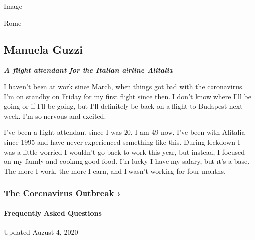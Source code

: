 Image

Rome

\hypertarget{manuela-guzzi}{%
\subsection{Manuela Guzzi}\label{manuela-guzzi}}

\emph{\textbf{A flight attendant for the Italian airline Alitalia}}

I haven't been at work since March, when things got bad with the
coronavirus. I'm on standby on Friday for my first flight since then. I
don't know where I'll be going or if I'll be going, but I'll definitely
be back on a flight to Budapest next week. I'm so nervous and excited.

I've been a flight attendant since I was 20. I am 49 now. I've been with
Alitalia since 1995 and have never experienced something like this.
During lockdown I was a little worried I wouldn't go back to work this
year, but instead, I focused on my family and cooking good food. I'm
lucky I have my salary, but it's a base. The more I work, the more I
earn, and I wasn't working for four months.

\href{https://www.nytimes3xbfgragh.onion/news-event/coronavirus?action=click\&pgtype=Article\&state=default\&region=MAIN_CONTENT_3\&context=storylines_faq}{}

\hypertarget{the-coronavirus-outbreak-}{%
\subsubsection{The Coronavirus Outbreak
›}\label{the-coronavirus-outbreak-}}

\hypertarget{frequently-asked-questions}{%
\paragraph{Frequently Asked
Questions}\label{frequently-asked-questions}}

Updated August 4, 2020

